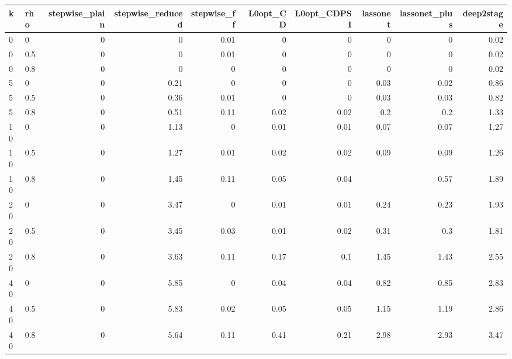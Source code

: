 \begin{tabular}{llrrrrrrrr}
\toprule
k & rho & stepwise\_plain & stepwise\_reduced & stepwise\_ff & L0opt\_CD & L0opt\_CDPSI & lassonet & lassonet\_plus & deep2stage \\
\midrule
0 & 0 & 0 & 0 & 0.01 & 0 & 0 & 0 & 0 & 0.02 \\
0 & 0.5 & 0 & 0 & 0.01 & 0 & 0 & 0 & 0 & 0.02 \\
0 & 0.8 & 0 & 0 & 0 & 0 & 0 & 0 & 0 & 0.02 \\
5 & 0 & 0 & 0.21 & 0 & 0 & 0 & 0.03 & 0.02 & 0.86 \\
5 & 0.5 & 0 & 0.36 & 0.01 & 0 & 0 & 0.03 & 0.03 & 0.82 \\
5 & 0.8 & 0 & 0.51 & 0.11 & 0.02 & 0.02 & 0.2 & 0.2 & 1.33 \\
10 & 0 & 0 & 1.13 & 0 & 0.01 & 0.01 & 0.07 & 0.07 & 1.27 \\
10 & 0.5 & 0 & 1.27 & 0.01 & 0.02 & 0.02 & 0.09 & 0.09 & 1.26 \\
10 & 0.8 & 0 & 1.45 & 0.11 & 0.05 & 0.04 &  & 0.57 & 1.89 \\
20 & 0 & 0 & 3.47 & 0 & 0.01 & 0.01 & 0.24 & 0.23 & 1.93 \\
20 & 0.5 & 0 & 3.45 & 0.03 & 0.01 & 0.02 & 0.31 & 0.3 & 1.81 \\
20 & 0.8 & 0 & 3.63 & 0.11 & 0.17 & 0.1 & 1.45 & 1.43 & 2.55 \\
40 & 0 & 0 & 5.85 & 0 & 0.04 & 0.04 & 0.82 & 0.85 & 2.83 \\
40 & 0.5 & 0 & 5.83 & 0.02 & 0.05 & 0.05 & 1.15 & 1.19 & 2.86 \\
40 & 0.8 & 0 & 5.64 & 0.11 & 0.41 & 0.21 & 2.98 & 2.93 & 3.47 \\
\bottomrule
\end{tabular}
